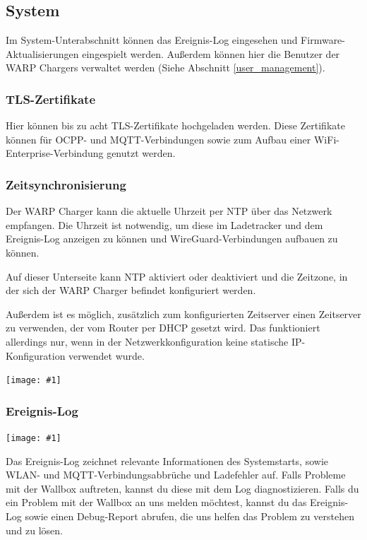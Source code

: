 \documentclass[a4paper,10pt]{article}
\newcommand{\gfx}[1]{\texttt{[image: \#1]}}
\begin{document}
\begin{multicols*}{2}
    \subsection{System}
    Im System-Unterabschnitt können das Ereignis-Log eingesehen und
	Firmware-Aktualisierungen eingespielt werden.
    Außerdem können hier die Benutzer der WARP Chargers verwaltet werden (Siehe
    Abschnitt \ref{user_management}).

    \subsubsection{TLS-Zertifikate}\label{tls}
    Hier können bis zu acht TLS-Zertifikate hochgeladen werden. Diese Zertifikate können
    für OCPP- und MQTT-Verbindungen sowie zum Aufbau einer WiFi-Enterprise-Verbindung genutzt werden.

    \subsubsection{Zeitsynchronisierung}\label{ntp}
    Der WARP Charger kann die aktuelle Uhrzeit per NTP über das Netzwerk empfangen.
    Die Uhrzeit ist notwendig, um diese im Ladetracker und dem Ereignis-Log anzeigen zu können und
    WireGuard-Verbindungen aufbauen zu können.

    Auf dieser Unterseite kann NTP aktiviert oder deaktiviert und die Zeitzone, in der sich
    der WARP Charger befindet konfiguriert werden.

    Außerdem ist es möglich, zusätzlich zum konfigurierten Zeitserver einen Zeitserver zu verwenden, der vom Router per DHCP gesetzt wird. Das funktioniert allerdings nur, wenn in der Netzwerkkonfiguration keine statische IP-Konfiguration verwendet wurde.

    \gfx{./img_warp2/resized/web_ntp}

    \subsubsection{Ereignis-Log}
    \gfx{./img_warp2/resized/web_event_log}

    \newpage
    Das Ereignis-Log zeichnet relevante Informationen des Systemstarts, sowie WLAN- und MQTT-Verbindungsabbrüche und Ladefehler auf.
    Falls Probleme mit der Wallbox auftreten, kannst du diese mit dem Log diagnostizieren.
    Falls du ein Problem mit der Wallbox an uns melden möchtest, kannst du das Ereignis-Log
    sowie einen Debug-Report abrufen, die uns helfen das Problem zu verstehen und zu lösen.


\end{multicols*}
\end{document}
